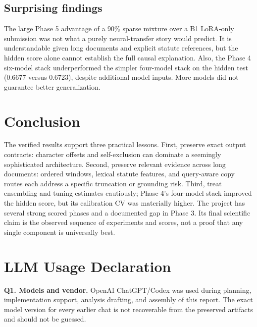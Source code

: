 \documentclass[11pt,oneside]{article}
\begin{document}
\subsection{Surprising findings}
The large Phase 5 advantage of a 90\% sparse mixture over a B1 LoRA-only submission was not what a purely neural-transfer story would predict. It is understandable given long documents and explicit statute references, but the hidden score alone cannot establish the full causal explanation. Also, the Phase 4 six-model stack underperformed the simpler four-model stack on the hidden test (0.6677 versus 0.6723), despite additional model inputs. More models did not guarantee better generalization.

\section{Conclusion}
The verified results support three practical lessons. First, preserve exact output contracts: character offsets and self-exclusion can dominate a seemingly sophisticated architecture. Second, preserve relevant evidence across long documents: ordered windows, lexical statute features, and query-aware copy routes each address a specific truncation or grounding risk. Third, treat ensembling and tuning estimates cautiously; Phase 4's four-model stack improved the hidden score, but its calibration CV was materially higher. The project has several strong scored phases and a documented gap in Phase 3. Its final scientific claim is the observed sequence of experiments and scores, not a proof that any single component is universally best.

\clearpage
\section*{LLM Usage Declaration}
\textbf{Q1. Models and vendor.} OpenAI ChatGPT/Codex was used during planning, implementation support, analysis drafting, and assembly of this report. The exact model version for every earlier chat is not recoverable from the preserved artifacts and should not be guessed.
\end{document}
